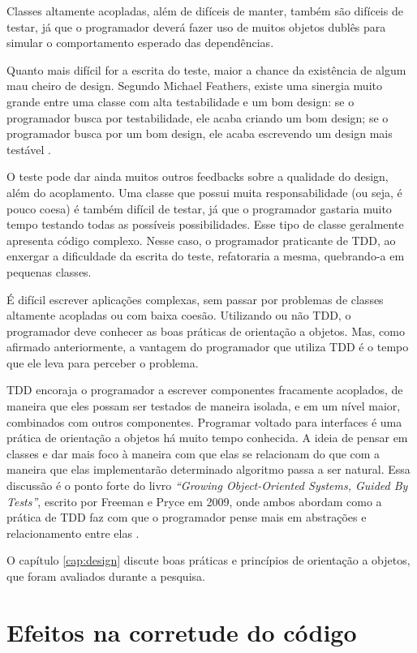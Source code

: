Classes altamente acopladas, além de difíceis de manter, também são difíceis de
testar, já que o programador deverá fazer uso de muitos objetos dublês para
simular o comportamento esperado das dependências.

Quanto mais difícil for a escrita do teste, maior a chance da existência de
algum mau cheiro de design. Segundo Michael Feathers, existe uma sinergia muito
grande entre uma classe com alta testabilidade e um bom design: se o
programador busca por testabilidade, ele acaba criando um bom design; se o
programador busca por um bom design, ele acaba escrevendo um design mais
testável \cite{feathers-synergy}.

O teste pode dar ainda muitos outros feedbacks sobre a qualidade do design,
além do acoplamento. Uma classe que possui muita responsabilidade (ou seja, é
pouco coesa) é também difícil de testar, já que o programador gastaria muito
tempo testando todas as possíveis possibilidades. Esse tipo de classe geralmente
apresenta código complexo. Nesse caso, o programador praticante de TDD, ao
enxergar a dificuldade da escrita do teste, refatoraria a mesma, quebrando-a em
pequenas classes.

É difícil escrever aplicações complexas, sem passar por problemas de classes
altamente acopladas ou com baixa coesão. Utilizando ou não TDD, o programador
deve conhecer as boas práticas de orientação a objetos. Mas, como afirmado
anteriormente, a vantagem do programador que utiliza TDD é o tempo que ele leva
para perceber o problema.

TDD encoraja o programador a escrever componentes fracamente acoplados, de
maneira que eles possam ser testados de maneira isolada, e em um nível maior,
combinados com outros componentes.
Programar voltado para interfaces é uma prática de orientação a objetos há muito
tempo conhecida. A ideia de pensar em classes e dar mais foco à maneira com que
elas se relacionam do que com a maneira que elas implementarão determinado
algoritmo passa a ser natural. Essa discussão é o ponto forte do livro
\textit{``Growing Object-Oriented Systems, Guided By Tests''}, escrito por
Freeman e Pryce em 2009, onde ambos abordam como a prática de TDD faz com que
o programador pense mais em abstrações e relacionamento entre elas \cite{GOOS}.

O capítulo \ref{cap:design} discute boas práticas e princípios de orientação a
objetos, que foram avaliados durante a pesquisa.

\section{Efeitos na corretude do código}

